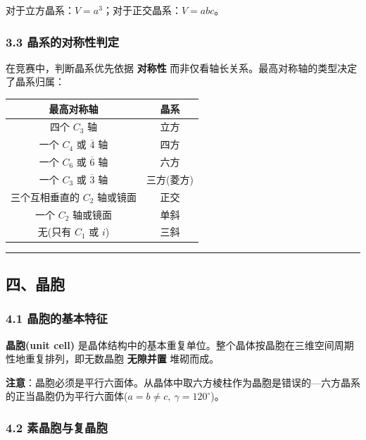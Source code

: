 对于立方晶系：\(V = a^3\)；对于正交晶系：\(V = abc\)。

\subsubsection{3.3 晶系的对称性判定}\label{ux6676ux7cfbux7684ux5bf9ux79f0ux6027ux5224ux5b9a}

在竞赛中，判断晶系优先依据 \textbf{对称性} 而非仅看轴长关系。最高对称轴的类型决定了晶系归属：

{\def\LTcaptype{none} %
\begin{longtable}[]{@{}cc@{}}
\toprule\noalign{}
最高对称轴 & 晶系 \\
\midrule\noalign{}
\endhead
\bottomrule\noalign{}
\endlastfoot
四个 \(C_3\) 轴 & 立方 \\
一个 \(C_4\) 或 \(\overline{4}\) 轴 & 四方 \\
一个 \(C_6\) 或 \(\overline{6}\) 轴 & 六方 \\
一个 \(C_3\) 或 \(\overline{3}\) 轴 & 三方(菱方) \\
三个互相垂直的 \(C_2\) 轴或镜面 & 正交 \\
一个 \(C_2\) 轴或镜面 & 单斜 \\
无(只有 \(C_1\) 或 \(i\)) & 三斜 \\
\end{longtable}
}

\begin{center}\rule{0.5\linewidth}{0.5pt}\end{center}

\subsection{四、晶胞}\label{ux56dbux6676ux80de}

\subsubsection{4.1 晶胞的基本特征}\label{ux6676ux80deux7684ux57faux672cux7279ux5f81}

\textbf{晶胞(unit cell)} 是晶体结构中的基本重复单位。整个晶体按晶胞在三维空间周期性地重复排列，即无数晶胞 \textbf{无隙并置} 堆砌而成。

\textbf{注意}：晶胞必须是平行六面体。从晶体中取六方棱柱作为晶胞是错误的---六方晶系的正当晶胞仍为平行六面体(\(a = b \neq c,\ \gamma = 120^\circ\))。

\subsubsection{4.2 素晶胞与复晶胞}\label{ux7d20ux6676ux80deux4e0eux590dux6676ux80de}

